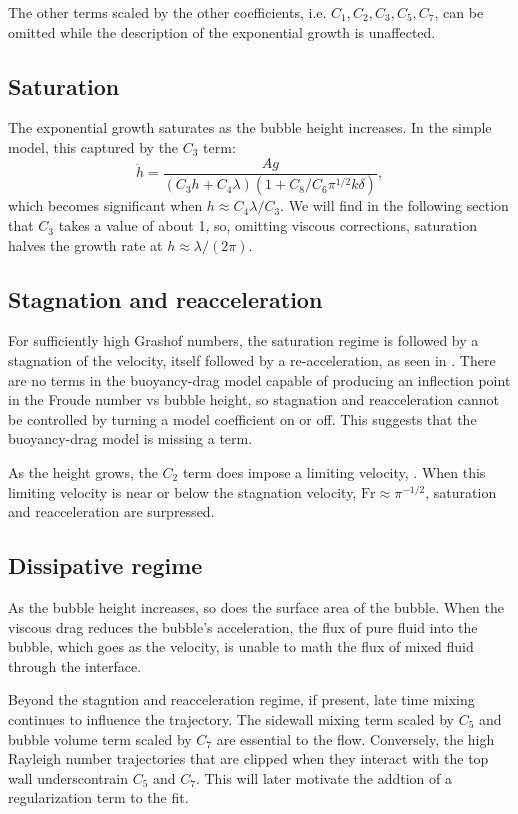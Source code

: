 The other terms scaled by the other coefficients, i.e. $C_1, C_2, C_3, C_5, C_7$, can be omitted while the description of the exponential growth is unaffected.

\subsection{Saturation}
The exponential growth saturates as the bubble height increases.
In the simple model, this captured by the $C_3$ term:
\begin{equation}
\ddot{h} = \frac{A g}{(C_3 h + C_4 \lambda) (1 + C_8 / C_6 \pi^{1/2} k \delta)},
\end{equation}
which becomes significant when $h \approx C_4 \lambda / C_3$.
We will find in the following section that $C_3$ takes a value of about 1, so, omitting viscous corrections, saturation halves the growth rate at $h \approx \lambda / (2\pi)$.

\subsection{Stagnation and reacceleration}

For sufficiently high Grashof numbers, the saturation regime is followed by a stagnation of the velocity, itself followed by a re-acceleration, as seen in .
There are no terms in the buoyancy-drag model capable of producing an inflection point in the Froude number vs bubble height, so stagnation and reacceleration cannot be controlled by turning a model coefficient on or off.
This suggests that the buoyancy-drag model is missing a term.

As the height grows, the $C_2$ term does impose a limiting velocity, .
When this limiting velocity is near or below the stagnation velocity, $\text{Fr} \approx \pi^{-1/2}$, saturation and reacceleration are surpressed.


\subsection{Dissipative regime}

As the bubble height increases, so does the surface area of the bubble.
When the viscous drag reduces the bubble's acceleration, the flux of pure fluid into the bubble, which goes as the velocity, is unable to math the flux of mixed fluid through the interface.

Beyond the stagntion and reacceleration regime, if present, late time mixing continues to influence the trajectory.
The sidewall mixing term scaled by $C_5$ and bubble volume term scaled by $C_7$ are essential to the flow.
Conversely, the high Rayleigh number trajectories that are clipped when they interact with the top wall underscontrain $C_5$ and $C_7$.
This will later motivate the addtion of a regularization term to the fit.

